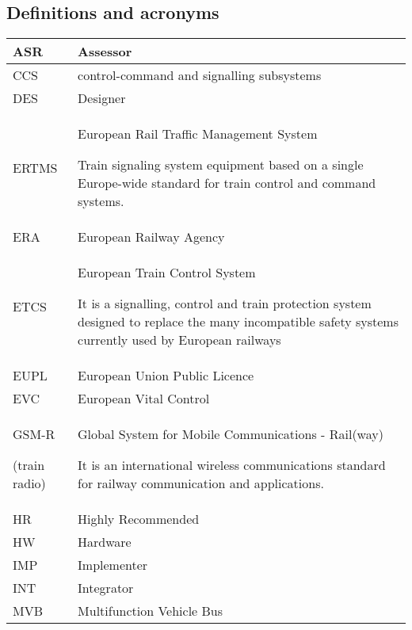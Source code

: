 \documentclass{template/openetcs_article}
\begin{document}


\subsection{Definitions and acronyms}
\tablehead{}
\tabletail{}
\tablelasttail{}
\begin{supertabular}{|m{3cm}m{11cm}|}
\hline
ASR &
Assessor\\\hline
CCS &
control-command and signalling subsystems  \\\hline
DES &
Designer\\\hline
ERTMS &
European Rail Traffic Management System

Train signaling system equipment based on a single Europe-wide standard for train control and command systems.\\\hline
ERA &
European Railway Agency\\\hline
ETCS &
European Train Control System

It is a signalling, control and train protection system designed to replace the many incompatible safety systems currently used by European railways\\\hline
EUPL &
European Union Public Licence\\\hline
EVC &
European Vital Control\\\hline
GSM-R

(train radio) &
Global System for Mobile Communications - Rail(way)

It is an international wireless communications standard for railway communication and applications.\\\hline
HR &
Highly Recommended\\\hline
HW &
Hardware\\\hline
IMP &
Implementer\\\hline
INT &
Integrator\\\hline
MVB &
Multifunction Vehicle Bus


\end{supertabular}
\end{document}
